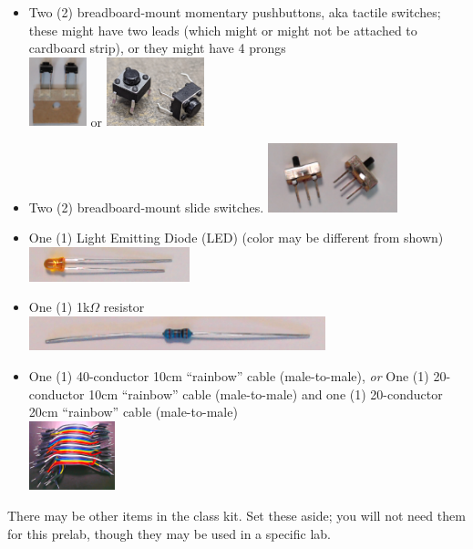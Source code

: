 \begin{itemize}
    \item Two (2) breadboard-mount momentary pushbuttons, aka tactile switches;
        these might have two leads (which might or might not be attached to cardboard strip), or they might have 4 prongs \\
        \includegraphics[height=2cm]{inventory/buttons-2pin} \hspace{1cm} or
        \hspace{1cm} \includegraphics[height=2cm]{inventory/buttons-4pin}
    \item Two (2) breadboard-mount slide switches.
        \includegraphics[height=2cm]{inventory/sliders-spdt}%
    \displaymoduleitem
    \item One (1) Light Emitting Diode (LED) (color may be different from shown) \\
        \includegraphics[height=1cm]{inventory/led}
    \item One (1) 1k$\Omega$ resistor \\
        \includegraphics[height=1cm]{inventory/resistor}
    \item One (1) 40-conductor 10cm ``rainbow'' cable (male-to-male), \textit{or} One (1) 20-conductor 10cm ``rainbow'' cable (male-to-male) and one (1) 20-conductor 20cm ``rainbow'' cable (male-to-male) \\
        \includegraphics[height=2cm]{inventory/mm-cable}
    \fmcableitem
\end{itemize}

There may be other items in the class kit.
Set these aside;
you will not need them for this prelab, though they may be used in a specific lab.
